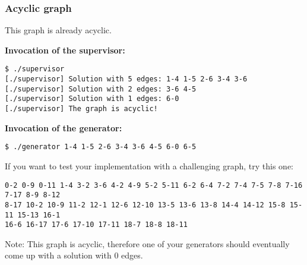\vspace{8mm}
\begin{multicols}{2}
\subsubsection*{Acyclic graph}


\vfill

This graph is already acyclic.

\columnbreak

\textbf{Invocation of the supervisor:}
\vspace{-5mm}
\begin{verbatim}
$ ./supervisor
[./supervisor] Solution with 5 edges: 1-4 1-5 2-6 3-4 3-6
[./supervisor] Solution with 2 edges: 3-6 4-5
[./supervisor] Solution with 1 edges: 6-0
[./supervisor] The graph is acyclic!
\end{verbatim}

\textbf{Invocation of the generator:}
\vspace{-5mm}
\begin{verbatim}
$ ./generator 1-4 1-5 2-6 3-4 3-6 4-5 6-0 6-5
\end{verbatim}
\end{multicols}

\vspace{8mm}
If you want to test your implementation with a challenging graph, try this one:

\texttt{0-2 0-9 0-11 1-4 3-2 3-6 4-2 4-9 5-2 5-11 6-2 6-4 7-2 7-4 7-5 7-8 7-16 7-17 8-9 8-12\\
8-17 10-2 10-9 11-2 12-1 12-6 12-10 13-5 13-6 13-8 14-4 14-12 15-8 15-11 15-13 16-1\\
16-6 16-17 17-6 17-10 17-11 18-7 18-8 18-11}

Note: This graph is acyclic,
therefore one of your generators should eventually come up with a solution with 0 edges.

\osueguidelinesthree


